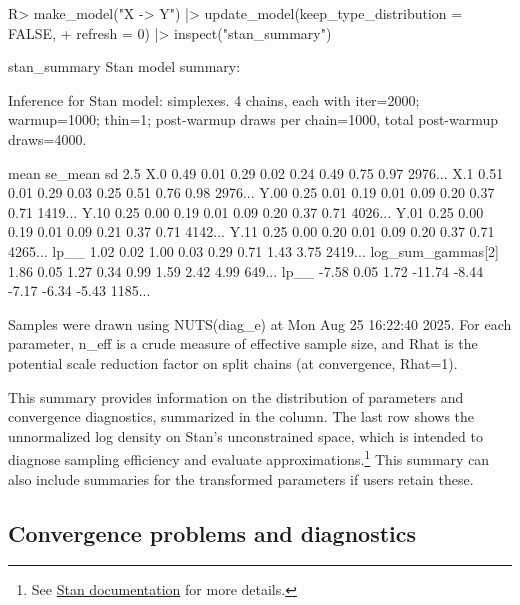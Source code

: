 \documentclass[
  11pt,
  article]{jss}
\renewcommand{\texttt}[1]{\code{#1}}
\begin{document}
\begin{CodeChunk}
\begin{CodeInput}
R> make_model("X -> Y") |> update_model(keep_type_distribution = FALSE, 
+    refresh = 0) |> inspect("stan_summary") 
\end{CodeInput}

\begin{CodeOutput}

stan_summary
Stan model summary:

Inference for Stan model: simplexes.
4 chains, each with iter=2000; warmup=1000; thin=1; 
post-warmup draws per chain=1000, total post-warmup draws=4000.

                   mean se_mean   sd   2.5%
X.0                0.49    0.01 0.29   0.02  0.24  0.49  0.75  0.97  2976...
X.1                0.51    0.01 0.29   0.03  0.25  0.51  0.76  0.98  2976...
Y.00               0.25    0.01 0.19   0.01  0.09  0.20  0.37  0.71  1419...
Y.10               0.25    0.00 0.19   0.01  0.09  0.20  0.37  0.71  4026...
Y.01               0.25    0.00 0.19   0.01  0.09  0.21  0.37  0.71  4142...
Y.11               0.25    0.00 0.20   0.01  0.09  0.20  0.37  0.71  4265...
lp__               1.02    0.02 1.00   0.03  0.29  0.71  1.43  3.75  2419...
log_sum_gammas[2]  1.86    0.05 1.27   0.34  0.99  1.59  2.42  4.99   649...
lp__              -7.58    0.05 1.72 -11.74 -8.44 -7.17 -6.34 -5.43  1185...

Samples were drawn using NUTS(diag_e) at Mon Aug 25 16:22:40 2025.
For each parameter, n_eff is a crude measure of effective sample size,
and Rhat is the potential scale reduction factor on split chains (at 
convergence, Rhat=1).
\end{CodeOutput}
\end{CodeChunk}

This summary provides information on the distribution of parameters and
convergence diagnostics, summarized in the \texttt{Rhat} column. The
last row shows the unnormalized log density on Stan's unconstrained
space, which is intended to diagnose sampling efficiency and evaluate
approximations.\footnote{See
  \href{https://mc-stan.org/cmdstanr/reference/fit-method-lp.html}{Stan
  documentation} for more details.} This summary can also include
summaries for the transformed parameters if users retain these.

\subsection{Convergence problems and
diagnostics}\label{convergence-problems-and-diagnostics}
\end{document}
